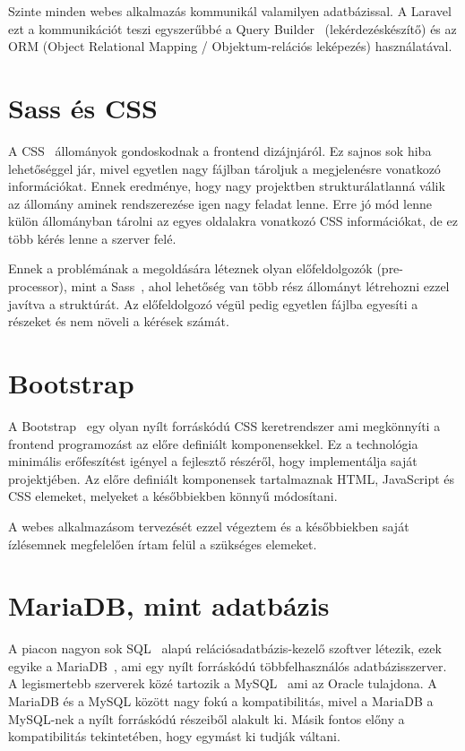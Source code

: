 \documentclass[
]{thesis-ekf}
\theoremstyle{definition}
\theoremstyle{remark}
\begin{document}
	Szinte minden webes alkalmazás kommunikál valamilyen adatbázissal. A Laravel ezt a kommunikációt teszi egyszerűbbé a Query Builder~\cite{laravel_querybuilder} (lekérdezéskészítő) és az ORM (Object Relational Mapping / Objektum-relációs leképezés) használatával. 
	
	\section{Sass és CSS}
	A CSS~\cite{css_doc} állományok gondoskodnak a frontend dizájnjáról. Ez sajnos sok hiba lehetőséggel jár, mivel egyetlen nagy fájlban tároljuk a megjelenésre vonatkozó információkat. Ennek eredménye, hogy nagy projektben strukturálatlanná válik az állomány aminek rendszerezése igen nagy feladat lenne. Erre jó mód lenne külön állományban tárolni az egyes oldalakra vonatkozó CSS információkat, de ez több kérés lenne a szerver felé. 
	
	Ennek a problémának a megoldására léteznek olyan előfeldolgozók (pre-processor), mint a Sass~\cite{sass_doc}, ahol lehetőség van több rész állományt létrehozni ezzel javítva a struktúrát. Az előfeldolgozó végül pedig egyetlen fájlba egyesíti a részeket és nem növeli a kérések számát. 
	
	\section{Bootstrap}
	A Bootstrap~\cite{bootstrap_doc} egy olyan nyílt forráskódú CSS keretrendszer ami megkönnyíti a frontend programozást az előre definiált komponensekkel. Ez a technológia minimális erőfeszítést igényel a fejlesztő részéről, hogy implementálja saját projektjében. Az előre definiált komponensek tartalmaznak HTML, JavaScript és CSS elemeket, melyeket a későbbiekben könnyű módosítani.
	
	A webes alkalmazásom tervezését ezzel végeztem és a későbbiekben saját ízlésemnek megfelelően írtam felül a szükséges elemeket. 
	
	\section{MariaDB, mint adatbázis}
	A piacon nagyon sok SQL~\cite{sql_book} alapú relációsadatbázis-kezelő szoftver létezik, ezek egyike a MariaDB~\cite{mariadb_doc}, ami egy nyílt forráskódú többfelhasználós adatbázisszerver. A legismertebb szerverek közé tartozik a MySQL~\cite{mysql_book} ami az Oracle tulajdona. A MariaDB és a MySQL között nagy fokú a kompatibilitás, mivel a MariaDB a MySQL-nek a nyílt forráskódú részeiből alakult ki. Másik fontos előny a kompatibilitás tekintetében, hogy egymást ki tudják váltani.
	
\end{document}
